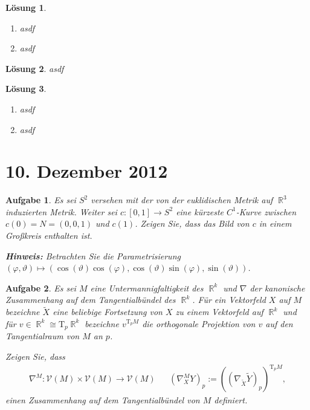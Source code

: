 \documentclass[paper=A4, twoside, chapterprefix=true, bibliography=totoc, headsepline]{scrbook}
\let\temp\phi
\let\phi\varphi
\let\varphi\temp
\let\temp\theta
\let\theta\vartheta
\let\vartheta\temp
\let\temp\epsilon
\let\epsilon\varepsilon
\let\varepsilon\temp
\let\temp\rho
\let\rho\varrho
\let\varrho\temp
\DeclareMathOperator{\R}{\mathbb{R}}
\theoremstyle{plain}
\theoremstyle{nonumberplain}
\theoremstyle{empty}
\theoremstyle{break}
\newtheorem{Aufg}{Aufgabe}
\newtheorem{Loes}{L\"osung}
\begin{document}
\begin{Loes}\begin{enumerate}[label=\alph*),leftmargin=*,widest=b]
\item
	asdf
\item
	asdf
\end{enumerate}\end{Loes}

\begin{Loes}
asdf
\end{Loes}

\begin{Loes}\begin{enumerate}[label=\alph*),leftmargin=*,widest=b]
\item
	asdf
\item
	asdf
\end{enumerate}\end{Loes}


\section{10. Dezember 2012}
\setcounter{Aufg}{0} %
\setcounter{Loes}{0}

\begin{Aufg}
Es sei $S^2$ versehen mit der von der euklidischen Metrik auf $\R^3$ induzierten Metrik. Weiter sei $c:[0,1] \to S^2$ eine kürzeste $C^1$-Kurve zwischen $c(0)=N=(0,0,1)$ und $c(1)$. Zeigen Sie, dass das Bild von $c$ in einem Großkreis enthalten ist.

{\footnotesize \textbf{Hinweis:} Betrachten Sie die Parametrisierung $(\phi,\theta)\mapsto (\cos(\theta) \cos(\phi),\cos(\theta) \sin(\phi),\sin(\theta))$.}
\end{Aufg}

\begin{Aufg}
Es sei $M$ eine Untermannigfaltigkeit des $\R^k$ und $\nabla$ der kanonische Zusammenhang auf dem Tangentialbündel des $\R^k$. Für ein Vektorfeld $X$ auf $M$ bezeichne $\tilde{X}$ eine beliebige Fortsetzung von $X$ zu einem Vektorfeld auf $\R^k$ und für $v\in \R^k \cong \mathrm{T}_p\R^k$ bezeichne $v^{\mathrm{T}_pM}$ die orthogonale Projektion von $v$ auf den Tangentialraum von $M$ an $p$. 

Zeigen Sie, dass
\begin{align*}
	\nabla^M:\mathcal{V}(M) \times \mathcal{V}(M) \to \mathcal{V}(M) && (\nabla^M_X Y)_p:=((\nabla_{\tilde{X}} \tilde{Y})_p)^{\mathrm{T}_pM},
\end{align*}
einen Zusammenhang auf dem Tangentialbündel von $M$ definiert.
\end{Aufg}
\end{document}
